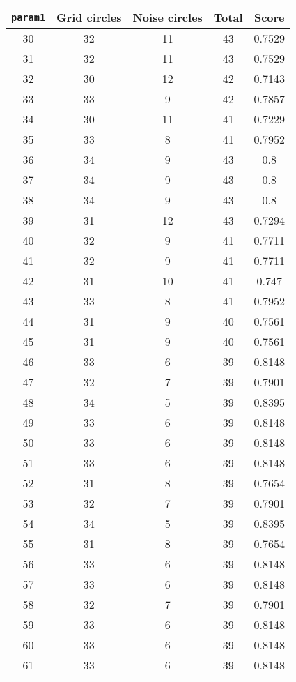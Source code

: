 \documentclass[letterpaper, 12pt]{article}
\begin{document}
\begin{longtable}{|c|c|c|c|c|}
\hline
\textbf{\texttt{param1}} & \textbf{Grid circles} & \textbf{Noise circles} & \textbf{Total} & \textbf{Score} \\
\hline
30 & 32 & 11 & 43 & 0.7529 \\
\hline
31 & 32 & 11 & 43 & 0.7529 \\
\hline
32 & 30 & 12 & 42 & 0.7143 \\
\hline
33 & 33 & 9 & 42 & 0.7857 \\
\hline
34 & 30 & 11 & 41 & 0.7229 \\
\hline
35 & 33 & 8 & 41 & 0.7952 \\
\hline
36 & 34 & 9 & 43 & 0.8 \\
\hline
37 & 34 & 9 & 43 & 0.8 \\
\hline
38 & 34 & 9 & 43 & 0.8 \\
\hline
39 & 31 & 12 & 43 & 0.7294 \\
\hline
40 & 32 & 9 & 41 & 0.7711 \\
\hline
41 & 32 & 9 & 41 & 0.7711 \\
\hline
42 & 31 & 10 & 41 & 0.747 \\
\hline
43 & 33 & 8 & 41 & 0.7952 \\
\hline
44 & 31 & 9 & 40 & 0.7561 \\
\hline
45 & 31 & 9 & 40 & 0.7561 \\
\hline
46 & 33 & 6 & 39 & 0.8148 \\
\hline
47 & 32 & 7 & 39 & 0.7901 \\
\hline
48 & 34 & 5 & 39 & 0.8395 \\
\hline
49 & 33 & 6 & 39 & 0.8148 \\
\hline
50 & 33 & 6 & 39 & 0.8148 \\
\hline
51 & 33 & 6 & 39 & 0.8148 \\
\hline
52 & 31 & 8 & 39 & 0.7654 \\
\hline
53 & 32 & 7 & 39 & 0.7901 \\
\hline
54 & 34 & 5 & 39 & 0.8395 \\
\hline
55 & 31 & 8 & 39 & 0.7654 \\
\hline
56 & 33 & 6 & 39 & 0.8148 \\
\hline
57 & 33 & 6 & 39 & 0.8148 \\
\hline
58 & 32 & 7 & 39 & 0.7901 \\
\hline
59 & 33 & 6 & 39 & 0.8148 \\
\hline
60 & 33 & 6 & 39 & 0.8148 \\
\hline
61 & 33 & 6 & 39 & 0.8148 \\

\end{longtable}
\end{document}
